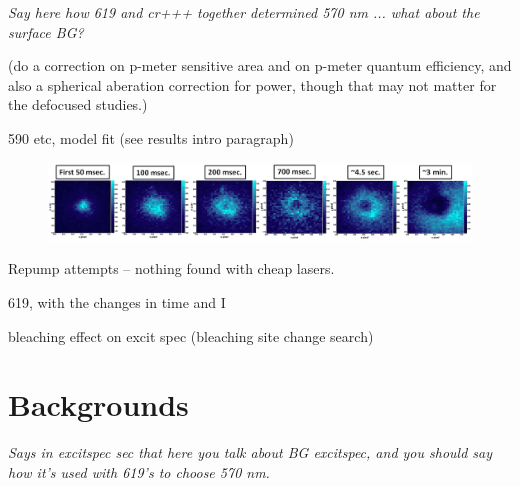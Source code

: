\emph{\color{gray}Say here how 619 and cr+++ together determined 570 nm ... what about the surface BG?}

({\color{red}do a correction on p-meter sensitive area and on p-meter quantum efficiency, and also a spherical aberation correction for power, though that may not matter for the defocused studies.})

590 etc, model fit (see results intro paragraph)

\begin{figure} %
        \centering
                \includegraphics[width=.9\textwidth]{figures/hole_bleach_590.png}
                \caption{}
\label{fig:testfig}
\end{figure}

Repump attempts -- nothing found with cheap lasers.

619, with the changes in time and I

bleaching effect on excit spec (bleaching site change search)

\section{Backgrounds}
\label{sec:bgs}

\emph{\color{gray}Says in excitspec sec that here you talk about BG excitspec, and you should say how it's used with 619's to choose 570 nm.}

